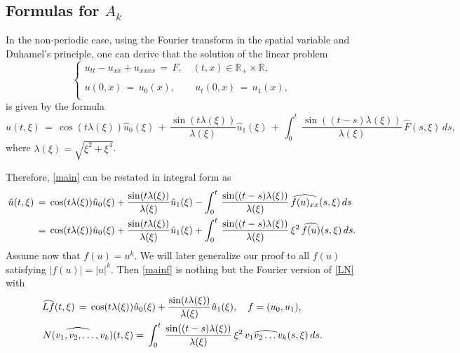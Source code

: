 \documentclass{amsart}
\begin{document}
\subsection{Formulas for $A_{k}$} In the non-periodic case, using the Fourier transform in the spatial variable and Duhamel's principle, one can derive that the solution of the linear problem
\begin{equation}
\left\{
\begin{array}{l}
u_{tt}-u_{xx}+u_{xxxx}\,=\,F, \quad (t,x)\in \mathbb{R}_+\times\mathbb{R},\\
\\
u(0,x)\,=\,u_0(x),\qquad u_t(0,x)\,=\,u_1(x),\\
\end{array}\right.
\label{hom}
\end{equation}
is given by the formula
\begin{equation}
\hat{u}(t,\xi)\,=\,\cos(t \lambda(\xi)) \hat{u}_0(\xi)\,+\,\frac{\sin(t \lambda(\xi))}{\lambda(\xi)} \hat{u}_1(\xi)\,+\,\int_0^t\,\frac{\sin((t-s) \lambda(\xi))}{\lambda(\xi)} \,\hat{F}(s,\xi)\,ds,
\label{lin}\end{equation}
where $\lambda(\xi)=\sqrt{\xi^2+\xi^4}$. 

Therefore, \eqref{main} can be restated in integral form as
\begin{equation}
\aligned
\hat{u}(t,\xi)\,&=\,\cos(t \lambda(\xi)) \hat{u}_0(\xi)+\frac{\sin(t \lambda(\xi))}{\lambda(\xi)} \hat{u}_1(\xi)-\int_0^t\,\frac{\sin((t-s) \lambda(\xi))}{\lambda(\xi)} \,\widehat{f(u)_{xx}}(s,\xi)\,ds\\
&=\,\cos(t \lambda(\xi)) \hat{u}_0(\xi)+\frac{\sin(t \lambda(\xi))}{\lambda(\xi)} \hat{u}_1(\xi)+\int_0^t\,\frac{\sin((t-s) \lambda(\xi))}{\lambda(\xi)}\, \xi^2\, \widehat{f(u)}(s,\xi)\,ds.\endaligned
\label{mainf}
\end{equation}
Assume now that $f(u) = u^{k}$. We will later generalize our proof to all $f(u)$ satisfying $|f(u)| = |u|^{k}$. Then \eqref{mainf} is
nothing but the Fourier version of \eqref{LN} with
\begin{equation}
\aligned
\widehat{Lf}(t,\xi)\,=\,\cos(t \lambda(\xi))& \hat{u}_0(\xi)+\frac{\sin(t \lambda(\xi))}{\lambda(\xi)} \hat{u}_1(\xi),\quad f=(u_0,u_1),\\
\widehat{N(v_{1},v_{2}, \dots, v_{k})}(t,\xi)&=\,\int_0^t\,\frac{\sin((t-s) \lambda(\xi))}{\lambda(\xi)}\, \xi^2\, \widehat{v_{1}  v_{2}  \dots v_{k}}(s,\xi)\,ds.\endaligned
\label{lnf}
\end{equation}
\end{document}
